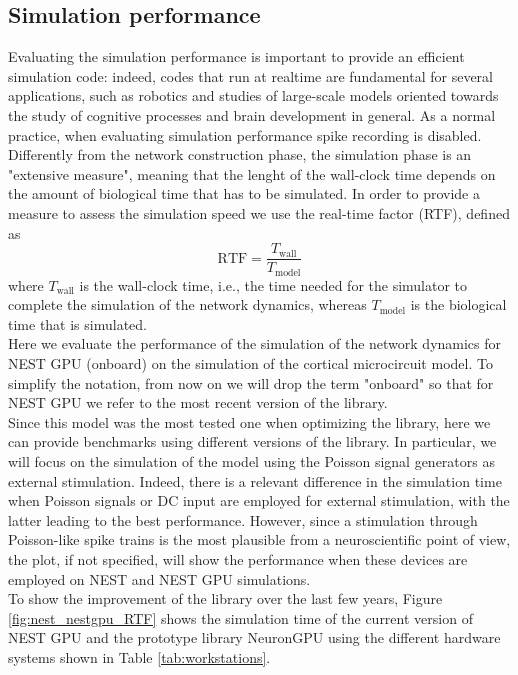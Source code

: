 \documentclass[a4paper, 12pt, twoside, openright]{book}
\begin{document}
\subsection{Simulation performance}
Evaluating the simulation performance is important to provide an efficient simulation code: indeed, codes that run at realtime are fundamental for several applications, such as robotics and studies of large-scale models oriented towards the study of cognitive processes and brain development in general. As a normal practice, when evaluating simulation performance spike recording is disabled. Differently from the network construction phase, the simulation phase is an "extensive measure", meaning that the lenght of the wall-clock time depends on the amount of biological time that has to be simulated. In order to provide a measure to assess the simulation speed we use the real-time factor (RTF), defined as
\begin{equation}
\label{eq:RTF}
    \text{RTF} = \dfrac{T_{\text{wall}}}{T_{\text{model}}}
\end{equation}
where $T_{\text{wall}}$ is the wall-clock time, i.e., the time needed for the simulator to complete the simulation of the network dynamics, whereas $T_{\text{model}}$ is the biological time that is simulated.\\
Here we evaluate the performance of the simulation of the network dynamics for NEST GPU (onboard) on the simulation of the cortical microcircuit model. To simplify the notation, from now on we will drop the term "onboard" so that for NEST GPU we refer to the most recent version of the library.\\
Since this model was the most tested one when optimizing the library, here we can provide benchmarks using different versions of the library. In particular, we will focus on the simulation of the model using the Poisson signal generators as external stimulation. Indeed, there is a relevant difference in the simulation time when Poisson signals or DC input are employed for external stimulation, with the latter leading to the best performance. However, since a stimulation through Poisson-like spike trains is the most plausible from a neuroscientific point of view, the plot, if not specified, will show the performance when these devices are employed on NEST and NEST GPU simulations.\\
To show the improvement of the library over the last few years, Figure \ref{fig:nest_nestgpu_RTF} shows the simulation time of the current version of NEST GPU and the prototype library NeuronGPU using the different hardware systems shown in Table \ref{tab:workstations}.
\end{document}

